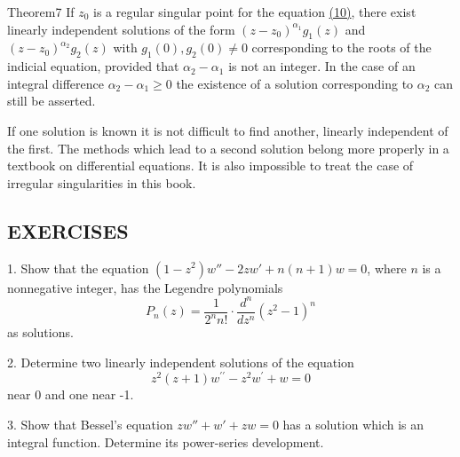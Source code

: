 \begin{originalstatement}{Theorem}{7}\label{thm:8.7}
If $z_0$ is a regular singular point for the equation \hyperref[eq:8.10]{(10)}, there exist linearly independent solutions of the form $(z - z_0)^{\alpha_1}g_1(z)$ and $(z - z_0)^{\alpha_2}g_2(z)$ with $g_1(0), g_2(0) \neq 0$ corresponding to the roots of the indicial equation, provided that $\alpha_2 - \alpha_1$ is not an integer. In the case of an integral difference $\alpha_2 - \alpha_1 \geq 0$ the existence of a solution corresponding to $\alpha_2$ can still be asserted.
\end{originalstatement}
If one solution is known it is not difficult to find another, linearly independent of the first. The methods which lead to a second solution belong more properly in a textbook on differential equations. It is also impossible to treat the case of irregular singularities in this book.

\subsection*{EXERCISES}
1. Show that the equation $(1 - z^{2})w'' - 2zw' + n(n + 1)w = 0$, where $n$ is a nonnegative integer, has the Legendre polynomials
\begin{equation*}
P _ {n} (z) = \frac {1}{2 ^ {n} n !} \cdot \frac {d ^ {n}}{d z ^ {n}} (z ^ {2} - 1) ^ {n}
\end{equation*}
as solutions.

2. Determine two linearly independent solutions of the equation
\begin{equation*}
z ^ {2} (z + 1) w ^ {\prime \prime} - z ^ {2} w ^ {\prime} + w = 0
\end{equation*}
near 0 and one near -1.

3. Show that Bessel's equation $zw'' + w' + zw = 0$ has a solution which is an integral function. Determine its power-series development.

